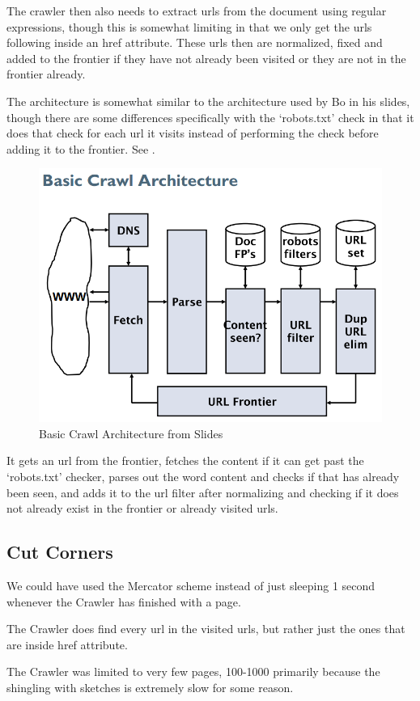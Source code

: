 	The crawler then also needs to extract urls from the document using regular expressions, though this is somewhat limiting in that we only get the urls following inside an href attribute. These urls then are normalized, fixed and added to the frontier if they have not already been visited or they are not in the frontier already.
	
	The architecture is somewhat similar to the architecture used by Bo in his slides, though there are some differences specifically with the `robots.txt' check in that it does that check for each url it visits instead of performing the check before adding it to the frontier. See .
	
	\begin{figure}[H]
	\centering
	\includegraphics[width=0.7\linewidth]{./Media/basiccrawlarchitecture}
	\caption{Basic Crawl Architecture from Slides}
	\label{fig:basiccrawlarchitecture}
	\end{figure}
	
	It gets an url from the frontier, fetches the content if it can get past the `robots.txt' checker, parses out the word content and checks if that has already been seen, and adds it to the url filter after normalizing and checking if it does not already exist in the frontier or already visited urls.
	
	\subsection{Cut Corners}
	We could have used the Mercator scheme instead of just sleeping 1 second whenever the Crawler has finished with a page.
	
	The Crawler does find every url in the visited urls, but rather just the ones that are inside href attribute.
	
	The Crawler was limited to very few pages, 100-1000 primarily because the shingling with sketches is extremely slow for some reason.
	
